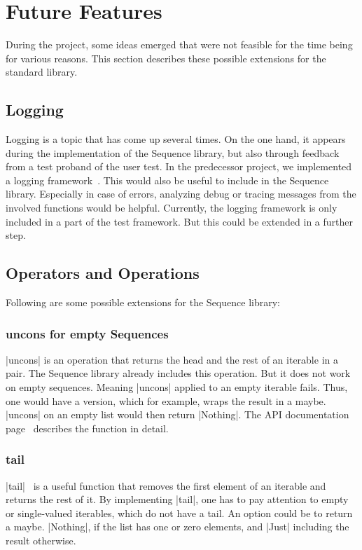 \section{Future Features}
\label{sec:Future Features}
During the project, some ideas emerged that were not feasible for the time
being for various reasons. This section describes these possible extensions for
the standard library.

\subsection{Logging}
\label{sub:Logging}
Logging is a topic that has come up several times. On the one hand, it appears
during the implementation of the Sequence library, but also through feedback
from a test proband of the user test. In the predecessor project, we implemented
a logging framework~\cite{wild_ip5_2023}. This would also be useful to include
in the Sequence library. Especially in case of errors, analyzing debug or
tracing messages from the involved functions would be helpful. Currently, the
logging framework is only included in a part of the test framework. But this
could be extended in a further step.

\subsection{Operators and Operations}
\label{sub:Operators and Operations}
Following are some possible extensions for the Sequence library:

\subsubsection{uncons for empty Sequences}
\label{subsub:uncons}
|uncons| is an operation that returns the head and the rest of an iterable in a
pair. The Sequence library already includes this operation.
But it does not work on empty sequences. Meaning |uncons| applied to an
empty iterable fails. Thus, one would have a version, which for example, wraps the
result in a maybe. |uncons| on an empty list would then return |Nothing|.
The API documentation page~\cite{hoogle_uncons} describes the function in
detail.

\subsubsection{tail}
\label{subsub:tail}
|tail|~\cite{hoogle_tail} is a useful function that removes the first element
of an iterable and returns the rest of it. By implementing |tail|, one has to
pay attention to empty or single-valued iterables, which do not have a tail. An
option could be to return a maybe. |Nothing|, if the list has one or zero
elements, and |Just| including the result otherwise.

